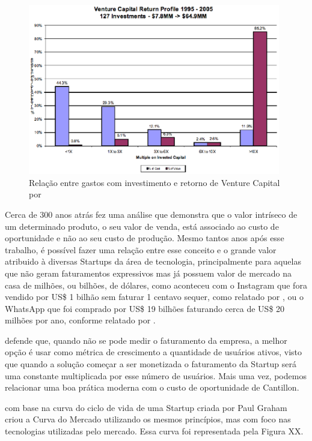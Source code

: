 \begin{figure}[!htb]
\centering
\includegraphics[width=11cm,angle=0]{figuras/venture_capital_profits}
\caption{Relação entre gastos com investimento e retorno de Venture Capital por \cite{Sahlman2010}}
\label{Rotulo}
\end{figure}

Cerca de 300 anos atrás  fez uma análise que demonstra que o valor intríseco de um determinado produto, o seu valor de venda, está associado ao custo de oportunidade e não ao seu custo de produção. Mesmo tantos anos após esse trabalho, é possível fazer uma relação entre esse conceito e o grande valor atribuido à diversas Startups da área de tecnologia, principalmente para aquelas que não geram faturamentos expressivos mas já possuem valor de mercado na casa de milhões, ou bilhões, de dólares, como aconteceu com o Instagram que fora vendido por US\$ 1 bilhão sem faturar 1 centavo sequer, como relatado por , ou o WhatsApp que foi comprado por US\$ 19 bilhões faturando cerca de US\$ 20 milhões por ano, conforme relatado por . 

 defende que, quando não se pode medir o faturamento da empresa, a melhor opção é usar como métrica de crescimento a quantidade de usuários ativos, visto que quando a solução começar a ser monetizada o faturamento da Startup será uma constante multiplicada por esse número de usuários. Mais uma vez, podemos relacionar uma boa prática moderna com o custo de oportunidade de Cantillon.

 com base na curva do ciclo de vida de uma Startup criada por Paul Graham criou a Curva do Mercado utilizando os mesmos princípios, mas com foco nas tecnologias utilizadas pelo mercado. Essa curva foi representada pela Figura XX.


